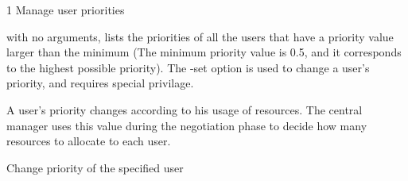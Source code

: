 \begin{ManPage}{\label{man-condor-userprio}}{1}
{Manage user priorities} 
\Synopsis {}

\Description 
{} with no arguments, lists the priorities of all
the users that have a priority value larger than the minimum (The minimum
priority value is 0.5, and it corresponds to the highest possible
priority). The -set option is used to change a user's priority, and requires
special privilage.

A user's priority changes according to his usage of resources. The central
manager uses this value during the negotiation phase to decide how many
resources to allocate to each user.

\begin{Options}


	{Change priority of the specified user}
\end{Options}

\end{ManPage}
